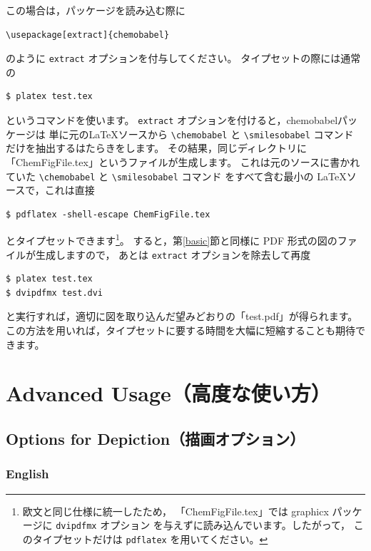 \documentclass[12pt]{ltjsarticle}
\begin{document}
この場合は，パッケージを読み込む際に
\begin{verbatim}
\usepackage[extract]{chemobabel}
\end{verbatim}
のように \verb|extract| オプションを付与してください。
タイプセットの際には通常の
\begin{verbatim}
$ platex test.tex
\end{verbatim}
というコマンドを使います。
\verb|extract| オプションを付けると，\textsf{chemobabel}パッケージは
単に元の\LaTeX ソースから \verb|\chemobabel| と \verb|\smilesobabel| コマンド
だけを抽出するはたらきをします。
その結果，同じディレクトリに「ChemFigFile.tex」というファイルが生成します。
これは元のソースに書かれていた \verb|\chemobabel| と \verb|\smilesobabel| コマンド
をすべて含む最小の \LaTeX ソースで，これは直接
\begin{verbatim}
$ pdflatex -shell-escape ChemFigFile.tex
\end{verbatim}
とタイプセットできます\footnote{欧文と同じ仕様に統一したため，
「ChemFigFile.tex」では \textsf{graphicx} パッケージに \texttt{dvipdfmx} オプション
を与えずに読み込んでいます。したがって，
このタイプセットだけは \texttt{pdflatex} を用いてください。}。
すると，第\ref{basic}節と同様に PDF 形式の図のファイルが生成しますので，
あとは \verb|extract| オプションを除去して再度
\begin{verbatim}
$ platex test.tex
$ dvipdfmx test.dvi
\end{verbatim}
と実行すれば，適切に図を取り込んだ望みどおりの「test.pdf」が得られます。
この方法を用いれば，タイプセットに要する時間を大幅に短縮することも期待できます。

\clearpage

\section{Advanced Usage（高度な使い方）}

\subsection{Options for Depiction（描画オプション）} \label{depict}

\subsubsection{English}
\end{document}
